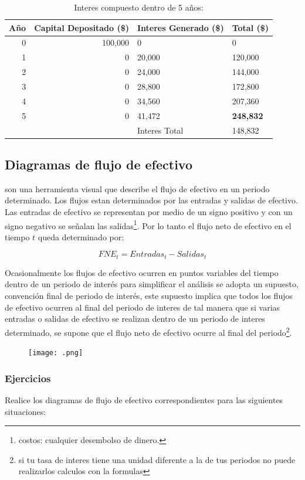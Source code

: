 \documentclass[11pt]{article}
\begin{document}
\begin{table}[htbp]
\centering
\begin{tabular}{rrll}
Año & Capital Depositado (\$) & Interes Generado (\$) & Total (\$)\\
\hline
0 & 100,000 & 0 & 0\\
1 & 0 & 20,000 & 120,000\\
2 & 0 & 24,000 & 144,000\\
3 & 0 & 28,800 & 172,800\\
4 & 0 & 34,560 & 207,360\\
5 & 0 & 41,472 & \textbf{248,832}\\
\hline
 &  & Interes Total & 148,832\\
\end{tabular}
\caption{Interes compuesto dentro de 5 años:}

\end{table}

\subsection*{Diagramas de flujo de efectivo}
\label{sec:orgf3ac324}
son una herramienta visual que describe el flujo de efectivo en un periodo determinado. Los flujos estan determinados por las entradas y salidas de efectivo. Las entradas de efectivo se representan por medio de un signo positivo y con un signo negativo se señalan las salidas\footnote{costos: cualquier desembolso de dinero.}. Por lo tanto el flujo neto de efectivo en el tiempo \(t\) queda determinado por:

\[FNE_t = Entradas_t - Salidas_t\]

Ocasionalmente los flujos de efectivo ocurren en puntos variables del tiempo dentro de un periodo de interés para simplificar el análisis se adopta un supuesto, convención final de periodo de interés, este supuesto implica que todos los flujos de efectivo ocurren al final del periodo de interes de tal manera que si varias entradas o salidas de efectivo se realizan dentro de un periodo de interes determinado, se supone que el flujo neto de efectivo ocurre al final del periodo\footnote{si tu tasa de interes tiene una unidad diferente a la de tus periodos no puede realizarlos calculos con la formulas}.

\begin{figure}[htbp]
\centering
\texttt{[image: .png]}
\caption{}
\end{figure}


\subsubsection*{Ejercicios}
\label{sec:org254f087}
Realice los diagramas de flujo de efectivo correspondientes para las siguientes situaciones:
\end{document}
